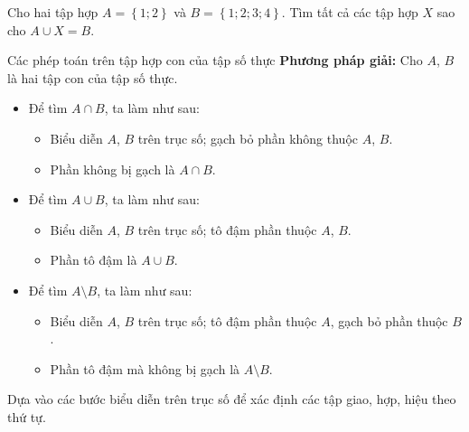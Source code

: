 \begin{vd}%
	Cho hai tập hợp $A=\left\{1;2\right\}$ và $B=\left\{1;2;3;4\right\}$. Tìm tất cả các tập hợp $X$ sao cho $A\cup X=B$.
\end{vd}
\begin{dang}{Các phép toán trên tập hợp con của tập số thực}
	\textbf{Phương pháp giải:} Cho $A$, $B$ là hai tập con của tập số thực.
\begin{itemize}
	\item Để tìm $A \cap B$, ta làm như sau:
	\begin{itemize}
		\item Biểu diễn $A$, $B$ trên trục số; gạch bỏ phần không thuộc $A$, $B$.
		\item Phần không bị gạch là $A \cap B$.
	\end{itemize}
	\item Để tìm $A \cup B$, ta làm như sau:
	\begin{itemize}
		\item Biểu diễn $A$, $B$ trên trục số; tô đậm phần thuộc $A$, $B$.
		\item Phần tô đậm là $A \cup B$.
	\end{itemize}
	\item Để tìm $A \setminus B$, ta làm như sau:
\begin{itemize}
	\item Biểu diễn $A$, $B$ trên trục số; tô đậm phần thuộc $A$, gạch bỏ phần thuộc $B$.
	\item Phần tô đậm mà không bị gạch là $A \setminus B$.
\end{itemize}
\end{itemize}
Dựa vào các bước biểu diễn trên trục số để xác định các tập giao, hợp, hiệu theo thứ tự.
\end{dang}

